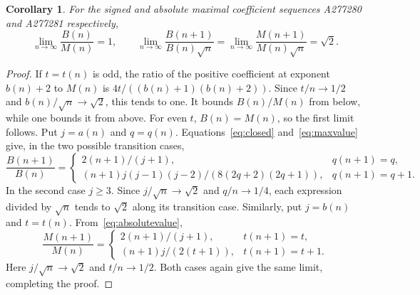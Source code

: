 \documentclass[11pt]{article}
\newtheorem{corollary}[theorem]{Corollary}
\begin{document}
\begin{corollary}\label{cor:values}
For the signed and absolute maximal coefficient sequences A277280 and
A277281 respectively,
\[
 \lim_{n\to\infty}\frac{B(n)}{M(n)}=1,\qquad
 \lim_{n\to\infty}\frac{B(n+1)}{B(n)\sqrt n}
 =\lim_{n\to\infty}\frac{M(n+1)}{M(n)\sqrt n}=\sqrt2.
\]
\end{corollary}
\begin{proof}
If $t=t(n)$ is odd, the ratio of the positive coefficient at exponent
$b(n)+2$ to $M(n)$ is $4t/((b(n)+1)(b(n)+2))$.
Since $t/n\to1/2$ and $b(n)/\sqrt n\to\sqrt2$, this tends to one.
It bounds $B(n)/M(n)$ from below, while one bounds it from above.
For even $t$, $B(n)=M(n)$, so the first limit follows.
Put $j=a(n)$ and $q=q(n)$. Equations~\eqref{eq:closed}
and~\eqref{eq:maxvalue} give, in the two possible transition cases,
\[
 \frac{B(n+1)}{B(n)}=
 \begin{cases}
  2(n+1)/(j+1),&q(n+1)=q,\\
  (n+1)j(j-1)(j-2)/(8(2q+2)(2q+1)),&q(n+1)=q+1.
 \end{cases}
\]
In the second case $j\geq3$. Since $j/\sqrt n\to\sqrt2$
and $q/n\to1/4$, each expression divided by $\sqrt n$ tends to
$\sqrt2$ along its transition case.
Similarly, put $j=b(n)$ and $t=t(n)$. From~\eqref{eq:absolutevalue},
\[
 \frac{M(n+1)}{M(n)}=
 \begin{cases}
  2(n+1)/(j+1),&t(n+1)=t,\\
  (n+1)j/(2(t+1)),&t(n+1)=t+1.
 \end{cases}
\]
Here $j/\sqrt n\to\sqrt2$ and $t/n\to1/2$.
Both cases again give the same limit, completing the proof.
\end{proof}
\end{document}
